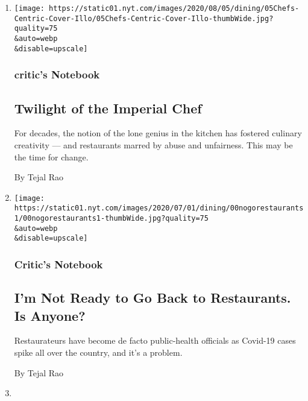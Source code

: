 \begin{enumerate}
\def\labelenumi{\arabic{enumi}.}
\item
  \href{/2020/08/04/dining/chef-restaurant-culture.html}{}

  \texttt{[image: https://static01.nyt.com/images/2020/08/05/dining/05Chefs-Centric-Cover-Illo/05Chefs-Centric-Cover-Illo-thumbWide.jpg?quality=75\\\&auto=webp\\\&disable=upscale]}

  \hypertarget{critics-notebook}{%
  \subsubsection{critic's Notebook}\label{critics-notebook}}

  \hypertarget{twilight-of-the-imperial-chef}{%
  \subsection{Twilight of the Imperial
  Chef}\label{twilight-of-the-imperial-chef}}

  For decades, the notion of the lone genius in the kitchen has fostered
  culinary creativity --- and restaurants marred by abuse and
  unfairness. This may be the time for change.

  By Tejal Rao
\item
  \href{/2020/06/30/dining/restaurant-risks-coronavirus.html}{}

  \texttt{[image: https://static01.nyt.com/images/2020/07/01/dining/00nogorestaurants1/00nogorestaurants1-thumbWide.jpg?quality=75\\\&auto=webp\\\&disable=upscale]}

  \hypertarget{critics-notebook-1}{%
  \subsubsection{Critic's Notebook}\label{critics-notebook-1}}

  \hypertarget{im-not-ready-to-go-back-to-restaurants-is-anyone}{%
  \subsection{I'm Not Ready to Go Back to Restaurants. Is
  Anyone?}\label{im-not-ready-to-go-back-to-restaurants-is-anyone}}

  Restaurateurs have become de facto public-health officials as Covid-19
  cases spike all over the country, and it's a problem.

  By Tejal Rao
\item
  \href{/2020/06/24/magazine/the-secret-to-perfect-pizza-at-home-cast-iron.html}{}


\end{enumerate}
